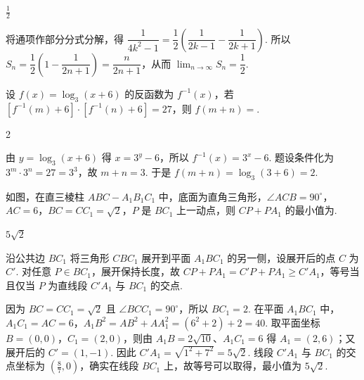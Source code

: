 \begin{answer}
\(\frac{1}{2}\)
\end{answer}

\begin{solution}
将通项作部分分式分解，得
\(\dfrac{1}{4k^2-1}=\dfrac12\left(\dfrac{1}{2k-1}-\dfrac{1}{2k+1}\right)\). 所以
\(S_n=\dfrac12\left(1-\dfrac{1}{2n+1}\right)=\dfrac{n}{2n+1}\)，从而 \(\displaystyle\lim_{n\to\infty}S_n=\dfrac12\).
\end{solution}

\begin{problem}
设 \( f(x)=\log_{3}(x+6) \) 的反函数为 \( f^{-1}(x) \)，若 \( [f^{-1}(m)+6]\cdot[f^{-1}(n)+6]=27 \)，则 \( f(m+n)= \)\fillinblank{}.
\end{problem}

\begin{answer}
2
\end{answer}

\begin{solution}
由 \(y=\log_3(x+6)\) 得 \(x=3^y-6\)，所以 \(f^{-1}(x)=3^x-6\). 题设条件化为 \(3^m\cdot3^n=27=3^3\)，故 \(m+n=3\). 于是 \(f(m+n)=\log_3(3+6)=2\).
\end{solution}

\begin{problem}
如图，在直三棱柱 \(ABC - A_{1}B_{1}C_{1}\) 中，底面为直角三角形，\(\angle ACB = 90^{\circ}\)，\(AC = 6\)，\(BC = CC_{1} = \sqrt{2}\)，\(P\) 是 \(BC_{1}\) 上一动点，则 \(CP + PA_{1}\) 的最小值为\fillinblank{}.

\end{problem}

\begin{answer}
\(5\sqrt{2}\)
\end{answer}

\begin{solution}
沿公共边 \(BC_1\) 将三角形 \(CBC_1\) 展开到平面 \(A_1BC_1\) 的另一侧，设展开后的点 \(C\) 为 \(C'\). 对任意 \(P\in BC_1\)，展开保持长度，故 \(CP+PA_1=C'P+PA_1\geqslant C'A_1\)，等号当且仅当 \(P\) 为直线段 \(C'A_1\) 与 \(BC_1\) 的交点.

因为 \(BC=CC_1=\sqrt{2}\) 且 \(\angle BCC_1=90^\circ\)，所以 \(BC_1=2\). 在平面 \(A_1BC_1\) 中，\(A_1C_1=AC=6\)，\(A_1B^2=AB^2+AA_1^2=(6^2+2)+2=40\). 取平面坐标 \(B=(0,0)\)，\(C_1=(2,0)\)，则由 \(A_1B=2\sqrt{10}\)、\(A_1C_1=6\) 得 \(A_1=(2,6)\)；又展开后的 \(C'=(1,-1)\). 因此 \(C'A_1=\sqrt{1^2+7^2}=5\sqrt{2}\). 线段 \(C'A_1\) 与 \(BC_1\) 的交点坐标为 \((\frac{8}{7},0)\)，确实在线段 \(BC_1\) 上，故等号可以取得，最小值为 \(5\sqrt{2}\).
\end{solution}

